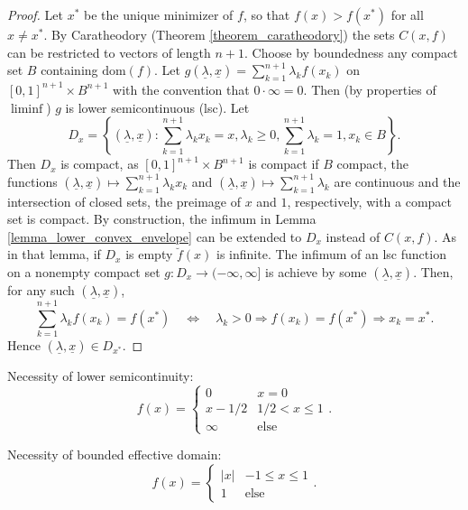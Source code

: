 \documentclass[12pt]{article}
\begin{document}
\begin{proof}
Let $x^{\ast}$ be the unique minimizer of $f$, so that $f(x) > f(x^{\ast})$ for all $x \ne x^{\ast}$.
By Caratheodory (Theorem \ref{theorem_caratheodory}) the sets $C(x,f)$ can be restricted to vectors of length $n+1$.
Choose by boundedness any compact set $B$ containing $\mathrm{dom}(f)$.
Let $g(\underline{\lambda},\underline{x}) = \sum_{k=1}^{n+1} \lambda_{k} f(x_{k})$ on $[0,1]^{n+1} \times B^{n+1}$ with the convention that $0 \cdot \infty = 0$.
Then (by properties of $\liminf$) $g$ is lower semicontinuous (lsc).
Let
\begin{equation*}
D_{x}
= \left\{ (\underline{\lambda},\underline{x}) : \sum_{k=1}^{n+1} \lambda_{k} x_{k} = x, \lambda_{k} \ge 0, \sum_{k=1}^{n+1} \lambda_{k} = 1, x_{k} \in B \right\}.
\end{equation*}
Then $D_{x}$ is compact, as $[0,1]^{n+1} \times B^{n+1}$ is compact if $B$ compact, the functions $(\underline{\lambda},\underline{x}) \mapsto \sum_{k=1}^{n+1} \lambda_{k} x_{k}$ and $(\underline{\lambda},\underline{x}) \mapsto \sum_{k=1}^{n+1} \lambda_{k}$ are continuous and the intersection of closed sets, the preimage of $x$ and $1$, respectively, with a compact set is compact.
By construction, the infimum in Lemma \ref{lemma_lower_convex_envelope} can be extended to $D_{x}$ instead of $C(x,f)$.
As in that lemma, if $D_{x}$ is empty $\breve{f}(x)$ is infinite.
The infimum of an lsc function on a nonempty compact set $g : D_{x} \rightarrow (-\infty,\infty]$ is achieve by some $(\underline{\lambda},\underline{x})$.
Then, for any such $(\underline{\lambda},\underline{x})$,
\begin{equation*}
\sum_{k=1}^{n+1} \lambda_{k} f(x_{k}) = f(x^{\ast})
\quad \Longleftrightarrow \quad
\lambda_{k} > 0 \Longrightarrow f(x_{k}) = f(x^{\ast}) \Longrightarrow x_{k} = x^{\ast}.
\end{equation*}
Hence $(\underline{\lambda},\underline{x}) \in D_{x^{\ast}}$.
\end{proof}

Necessity of lower semicontinuity:
\begin{equation*}
f(x) 
=
\begin{cases}
0 & x = 0 \\
x - 1/2 & 1/2 < x \le 1 \\
\infty & \text{else}
\end{cases}.
\end{equation*}

Necessity of bounded effective domain:
\begin{equation*}
f(x) 
=
\begin{cases}
\lvert x \rvert & -1 \le x \le 1 \\
1 & \text{else}
\end{cases}.
\end{equation*}
\end{document}
